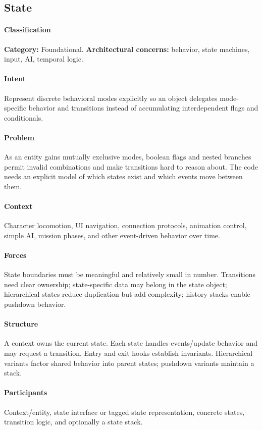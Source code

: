 \documentclass[11pt]{article}
\begin{document}
\subsection{State}\label{pat:state}
\paragraph{Classification} \textbf{Category:} Foundational. \textbf{Architectural concerns:} behavior, state machines, input, AI, temporal logic.
\paragraph{Intent} Represent discrete behavioral modes explicitly so an object delegates mode-specific behavior and transitions instead of accumulating interdependent flags and conditionals.
\paragraph{Problem} As an entity gains mutually exclusive modes, boolean flags and nested branches permit invalid combinations and make transitions hard to reason about. The code needs an explicit model of which states exist and which events move between them.
\paragraph{Context} Character locomotion, UI navigation, connection protocols, animation control, simple AI, mission phases, and other event-driven behavior over time.
\paragraph{Forces} State boundaries must be meaningful and relatively small in number. Transitions need clear ownership; state-specific data may belong in the state object; hierarchical states reduce duplication but add complexity; history stacks enable pushdown behavior.
\paragraph{Structure} A context owns the current state. Each state handles events/update behavior and may request a transition. Entry and exit hooks establish invariants. Hierarchical variants factor shared behavior into parent states; pushdown variants maintain a stack.
\paragraph{Participants} Context/entity, state interface or tagged state representation, concrete states, transition logic, and optionally a state stack.
\end{document}
